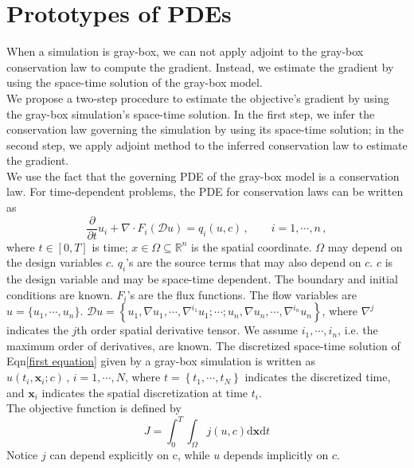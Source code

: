 \documentclass[a4paper,onecolumn]{article}
\theoremstyle{remark}
\begin{document}
\section {Prototypes of PDEs}
\label{prototypes}
\noindent When a simulation is gray-box, we can not apply adjoint to the gray-box conservation law to compute the gradient.
Instead, we estimate the gradient by using the space-time solution of the gray-box model.\\

\noindent We propose a two-step procedure to estimate the objective's gradient by using the 
gray-box simulation's space-time solution. In the first step, we infer the conservation law 
governing the simulation by using its space-time solution; in the second step, we apply
adjoint method to the inferred conservation law to estimate the gradient.\\

\noindent We use the fact that the governing PDE of the gray-box model is a conservation law. 
For time-dependent problems, the PDE for conservation laws can be written as
\begin{equation}
    \frac{\partial}{\partial t}u_i + \nabla \cdot 
    F_i(\mathcal{D} u) 
    = q_i(u,c)\,, \qquad i=1,\cdots, n\,,
    \label{first equation}
\end{equation}
where $t\in[0,T]$ is time;
$x\in \Omega \subseteq \mathbb{R}^{n}$ is the spatial coordinate.
$\Omega$ may depend on the design variables $c$.
$q_i$'s are the source terms that may also depend on $c$.
$c$ is the design variable and may be space-time dependent.
The boundary and initial conditions are known. $F_i$'s are the flux functions. 
The flow variables are 
$u = \{u_1, \cdots, u_n\}$.
$\mathcal{D} u = \left\{u_1, \nabla u_1 , \cdots, \nabla^{i_1} u_1; \cdots;
u_n, \nabla u_n,\cdots, \nabla^{i_n} u_n\right\}$, where $\nabla^j$ indicates the $j$th
order spatial derivative tensor. We assume $i_1,\cdots, i_n$, i.e. the maximum 
order of derivatives, are known.
The discretized space-time solution of Eqn\eqref{first equation} given by a gray-box simulation
is written as $\hat{u}(t_i, \mathbf{x}_i; c)\,,\, i=1,\cdots,N$, where 
$t=\left\{t_1,\cdots, t_N\right\}$ indicates the discretized time, and 
$\mathbf{x}_i$ indicates the spatial discretization at time $t_i$.\\

\noindent The objective function is defined by
\begin{equation}
    J = \int_0^T \int_\Omega j(u,c) \textrm{d}\mathbf{x}\textrm{d}t
    \label{obj prototype}
\end{equation}
Notice $j$ can depend explicitly on c, while $u$ depends implicitly on $c$.\\
\end{document}
